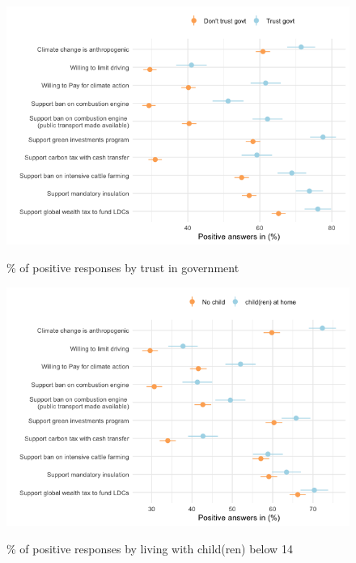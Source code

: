 \begin{framefont}{\small}
\begin{frame}{}%
\begin{figure}[h!]
\caption{\% of positive responses by trust in government}
\includegraphics[width=.7\paperwidth]{../figures/FR/positive_all_by_trust_govt_FR.png} \\
\end{figure}
\end{frame}

\begin{frame}{}%
\begin{figure}[h!]
\caption{\% of positive responses by living with child(ren) below 14}
\includegraphics[width=.7\paperwidth]{../figures/FR/positive_all_by_children_FR.png} \\
\end{figure}
\end{frame}


\end{framefont}
